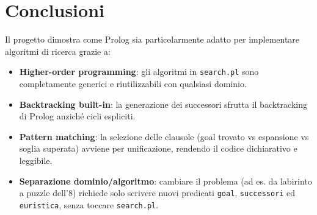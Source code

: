 \documentclass[12pt,a4paper]{article}
\begin{document}
\section*{Conclusioni}

Il progetto dimostra come Prolog sia particolarmente adatto per implementare
algoritmi di ricerca grazie a:
\begin{itemize}
  \item \textbf{Higher-order programming}: gli algoritmi in \texttt{search.pl}
        sono completamente generici e riutilizzabili con qualsiasi dominio.
  \item \textbf{Backtracking built-in}: la generazione dei successori sfrutta
        il backtracking di Prolog anziché cicli espliciti.
  \item \textbf{Pattern matching}: la selezione delle clausole (goal trovato vs
        espansione vs soglia superata) avviene per unificazione, rendendo il
        codice dichiarativo e leggibile.
  \item \textbf{Separazione dominio/algoritmo}: cambiare il problema (ad es.
        da labirinto a puzzle dell'8) richiede solo scrivere nuovi predicati
        \texttt{goal}, \texttt{successori} ed \texttt{euristica}, senza toccare
        \texttt{search.pl}.
\end{itemize}
\end{document}
